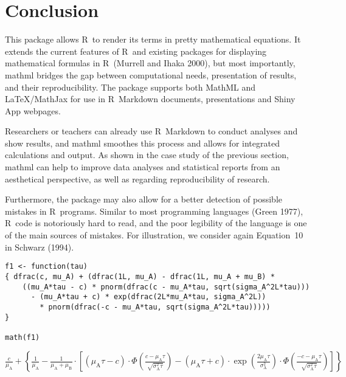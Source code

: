 \hypertarget{conclusion}{%
\section{Conclusion}\label{conclusion}}

This package allows R~to render its terms in pretty mathematical
equations. It extends the current features of R~and existing packages
for displaying mathematical formulas in R~(Murrell and Ihaka 2000), but
most importantly, mathml bridges the gap between computational needs,
presentation of results, and their reproducibility. The package supports
both MathML and LaTeX/MathJax for use in R~Markdown documents,
presentations and Shiny App webpages.

Researchers or teachers can already use R~Markdown to conduct analyses
and show results, and mathml smoothes this process and allows for
integrated calculations and output. As shown in the case study of the
previous section, mathml can help to improve data analyses and
statistical reports from an aesthetical perspective, as well as
regarding reproducibility of research.

Furthermore, the package may also allow for a better detection of
possible mistakes in R~programs. Similar to most programming languages
(Green 1977), R~code is notoriously hard to read, and the poor
legibility of the language is one of the main sources of mistakes. For
illustration, we consider again Equation~10 in Schwarz (1994).

\begin{verbatim}
f1 <- function(tau)
{ dfrac(c, mu_A) + (dfrac(1L, mu_A) - dfrac(1L, mu_A + mu_B) * 
    ((mu_A*tau - c) * pnorm(dfrac(c - mu_A*tau, sqrt(sigma_A^2L*tau)))
      - (mu_A*tau + c) * exp(dfrac(2L*mu_A*tau, sigma_A^2L))
        * pnorm(dfrac(-c - mu_A*tau, sqrt(sigma_A^2L*tau)))))
}

math(f1)
\end{verbatim}

\({\displaystyle{\frac{c}{{\mu}_{\mathrm{A}}}}}{+}{\left\{{\displaystyle{\frac{1}{{\mu}_{\mathrm{A}}}}}{-}{{\displaystyle{\frac{1}{{{\mu}_{\mathrm{A}}}{+}{{\mu}_{\mathrm{B}}}}}}{\cdot}{\left[{{\left({{{\mu}_{\mathrm{A}}}{{}}{\tau}}{-}{c}\right)}{\cdot}{\Phi{\left(\displaystyle{\frac{{c}{-}{{{\mu}_{\mathrm{A}}}{{}}{\tau}}}{\sqrt{{{\sigma}_{\mathrm{A}}^{2}}{{}}{\tau}}}}\right)}}}{-}{{{\left({{{\mu}_{\mathrm{A}}}{{}}{\tau}}{+}{c}\right)}{\cdot}{\exp{\left(\displaystyle{\frac{{{2}{{}}{{\mu}_{\mathrm{A}}}}{{}}{\tau}}{{\sigma}_{\mathrm{A}}^{2}}}\right)}}}{\cdot}{\Phi{\left(\displaystyle{\frac{{{-}{c}}{-}{{{\mu}_{\mathrm{A}}}{{}}{\tau}}}{\sqrt{{{\sigma}_{\mathrm{A}}^{2}}{{}}{\tau}}}}\right)}}}\right]}}\right\}}\)

